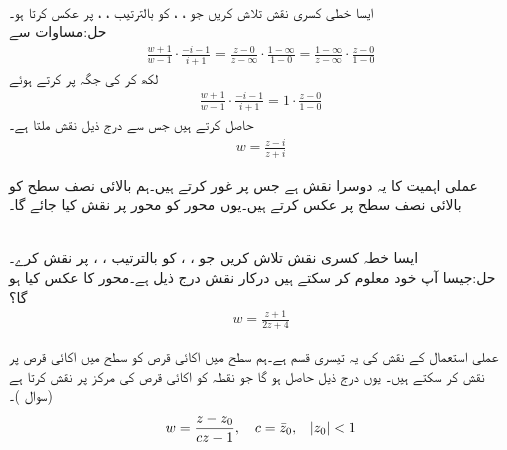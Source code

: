 \quad {}\\
ایسا خطی کسری نقش تلاش کریں جو ، ،  کو بالترتیب ، ،  پر عکس کرتا ہو۔\\
حل:\quad مساوات  سے 
\begin{align*}
\frac{w+1}{w-1}\cdot \frac{-i-1}{i+1}=\frac{z-0}{z-\infty}\cdot \frac{1-\infty}{1-0}=\frac{1-\infty}{z-\infty}\cdot \frac{z-0}{1-0}
\end{align*}
لکھ کر  کی جگہ  پر کرتے  ہوئے 
\begin{align*}
\frac{w+1}{w-1}\cdot \frac{-i-1}{i+1}=1\cdot \frac{z-0}{1-0}
\end{align*}
حاصل کرتے ہیں جس سے درج ذیل نقش ملتا ہے۔
\begin{align}\label{مساوات_نقش_مثال_ب}
w=\frac{z-i}{z+i}
\end{align}

 عملی اہمیت کا یہ دوسرا نقش ہے جس پر غور کرتے ہیں۔ہم بالائی نصف سطح  کو بالائی نصف سطح  پر عکس کرتے ہیں۔یوں محور  کو محور    پر نقش کیا جائے گا۔

\quad {}\\
ایسا خطہ کسری نقش تلاش کریں جو ، ،  کو بالترتیب ، ،  پر نقش کرے۔\\
حل:\quad جیسا آپ خود معلوم کر سکتے ہیں درکار نقش درج ذیل ہے۔محور  کا عکس کیا ہو گا؟
\begin{align}
w=\frac{z+1}{2z+4}
\end{align}

 عملی استعمال کے نقش کی یہ تیسری قسم ہے۔ہم  سطح میں اکائی قرص کو  سطح میں اکائی قرص پر نقش کر سکتے ہیں۔ یوں درج ذیل حاصل ہو گا جو نقطہ  کو اکائی قرص کی مرکز  پر نقش کرتا ہے (سوال )۔
\begin{align}\label{مساوات_نقش_قرص_کا_نقش_قرص}
w=\frac{z-z_0}{cz-1},\quad c=\bar{z}_0,\quad \abs{z_0}<1
\end{align}

